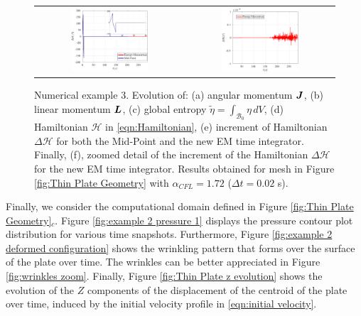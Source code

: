 \begin{figure}[hbtp!]
\begin{tabular}{cc}
		\includegraphics[width=0.55\textwidth]{Figures/Example2/EnergyBalance/DHFinal.eps} &
		\includegraphics[width=0.55\textwidth]{Figures/Example2/EnergyBalance/HEM.eps}\\
	\end{tabular}
	\caption{Numerical example 3. {Evolution of: (a) angular momentum $\boldsymbol{J}$, (b) linear momentum $\boldsymbol{L}$, (c) global entropy $\tilde{\eta}=\int_{\mathcal{B}_0}\eta\,dV$, (d) Hamiltonian $\mathcal{H}$  in \eqref{eqn:Hamiltonian}, (e) increment of Hamiltonian $\Delta\mathcal{H}$ for both the Mid-Point and the new EM time integrator.  Finally, (f), zoomed detail of the increment of the Hamiltonian  $\Delta\mathcal{H}$ for the new EM time integrator. Results obtained for mesh in Figure \ref{fig:Thin Plate Geometry} with $\alpha_{CFL}=1.72$ ($\Delta t=0.02$ s).}}
	\label{fig:CFL study thin plate}
\end{figure}


Finally, we consider the computational domain defined in Figure \ref{fig:Thin Plate Geometry}$_c$. Figure \ref{fig:example 2 pressure 1} displays the pressure contour plot distribution for various time snapshots. Furthermore, Figure \ref{fig:example 2 deformed configuration} shows the wrinkling pattern that forms over the surface of the plate over time. The wrinkles can be better appreciated in Figure \ref{fig:wrinkles zoom}. Finally, Figure \ref{fig:Thin Plate z evolution} shows the evolution of the $Z$ components of the displacement of the centroid of the plate over time, induced by the initial velocity profile in \eqref{eqn:initial velocity}.

